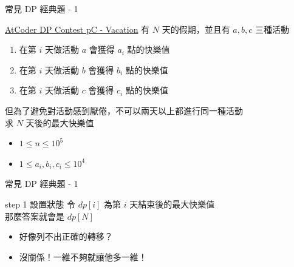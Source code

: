 \documentclass[aspectratio=169]{beamer}
\begin{document}
    \begin{frame}{常見 DP 經典題 - 1}
        \begin{block}{\href{https://atcoder.jp/contests/dp/tasks/dp_c}{AtCoder DP Contest pC - Vacation}}
            有 $N$ 天的假期，並且有 $a, b, c$ 三種活動 \\
            \begin{enumerate}
                \item 在第 $i$ 天做活動 $a$ 會獲得 $a_i$ 點的快樂值
                \item 在第 $i$ 天做活動 $b$ 會獲得 $b_i$ 點的快樂值
                \item 在第 $i$ 天做活動 $c$ 會獲得 $c_i$ 點的快樂值
            \end{enumerate}
            但為了避免對活動感到厭倦，不可以兩天以上都進行同一種活動 \\
            求 $N$ 天後的最大快樂值
            \vspace{2.5mm}
            \begin{itemize}
                \item $1 \leq n \leq 10^5$
                \item $1 \leq a_i, b_i, c_i \leq 10^4$
            \end{itemize}
        \end{block}
    \end{frame}

    \begin{frame}{常見 DP 經典題 - 1}
        \begin{alertblock}{step 1 設置狀態}
            令 $dp[i]$ 為第 $i$ 天結束後的最大快樂值 \\
            \vspace{2mm}
            那麼答案就會是 $dp[N]$
        \end{alertblock}
        \begin{itemize}
            \item<2-> 好像列不出正確的轉移？
            \item<3-> 沒關係！一維不夠就讓他多一維！
        \end{itemize}
    \end{frame}
\end{document}
